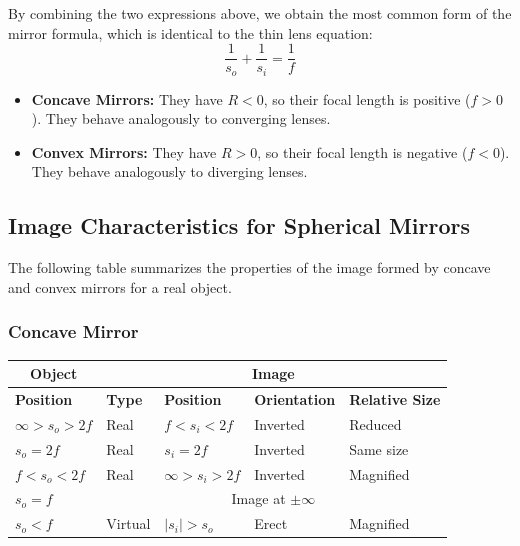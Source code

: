 By combining the two expressions above, we obtain the most common form of the mirror formula, which is identical to the thin lens equation:
$$ \frac{1}{s_o} + \frac{1}{s_i} = \frac{1}{f} $$

\begin{itemize}
    \item \textbf{Concave Mirrors:} They have $R < 0$, so their focal length is positive ($f > 0$). They behave analogously to converging lenses.
    \item \textbf{Convex Mirrors:} They have $R > 0$, so their focal length is negative ($f < 0$). They behave analogously to diverging lenses.
\end{itemize}

\subsection*{Image Characteristics for Spherical Mirrors}
The following table summarizes the properties of the image formed by concave and convex mirrors for a real object.

\vspace{0.5cm}
\subsubsection*{Concave Mirror}
\begin{center}
\begin{tabular}{|l|llll|}
\hline
\multicolumn{1}{|c|}{\textbf{Object}} & \multicolumn{4}{c|}{\textbf{Image}} \\ \hline
\textbf{Position} & \textbf{Type} & \textbf{Position} & \textbf{Orientation} & \textbf{Relative Size} \\ \hline
$\infty > s_o > 2f$ & Real & $f < s_i < 2f$ & Inverted & Reduced \\
$s_o = 2f$ & Real & $s_i = 2f$ & Inverted & Same size \\
$f < s_o < 2f$ & Real & $\infty > s_i > 2f$ & Inverted & Magnified \\
$s_o = f$ & \multicolumn{4}{c|}{Image at $\pm \infty$} \\
$s_o < f$ & Virtual & $|s_i| > s_o$ & Erect & Magnified \\ \hline
\end{tabular}
\end{center}

\vspace{1cm}

